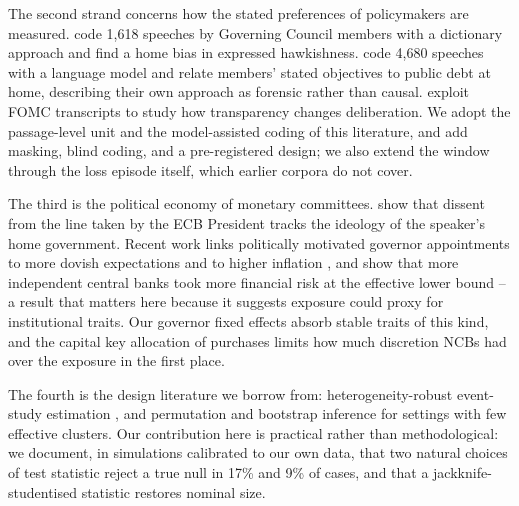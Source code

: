 \documentclass[11pt]{article}
\theoremstyle{plain}
\begin{document}
The second strand concerns how the stated preferences of policymakers are measured. \citet{bennani2017} code 1{,}618 speeches by Governing Council members with a dictionary approach and find a home bias in expressed hawkishness. \citet{heinemann2026} code 4{,}680 speeches with a language model and relate members' stated objectives to public debt at home, describing their own approach as forensic rather than causal. \citet{hansen2018} exploit FOMC transcripts to study how transparency changes deliberation. We adopt the passage-level unit and the model-assisted coding of this literature, and add masking, blind coding, and a pre-registered design; we also extend the window through the loss episode itself, which earlier corpora do not cover.

The third is the political economy of monetary committees. \citet{moschella2020} show that dissent from the line taken by the ECB President tracks the ideology of the speaker's home government. Recent work links politically motivated governor appointments to more dovish expectations and to higher inflation \citep{imf2026governors}, and \citet{bartels2026} show that more independent central banks took more financial risk at the effective lower bound -- a result that matters here because it suggests exposure could proxy for institutional traits. Our governor fixed effects absorb stable traits of this kind, and the capital key allocation of purchases limits how much discretion NCBs had over the exposure in the first place.

The fourth is the design literature we borrow from: heterogeneity-robust event-study estimation \citep{borusyak2024,callaway2021}, and permutation and bootstrap inference for settings with few effective clusters. Our contribution here is practical rather than methodological: we document, in simulations calibrated to our own data, that two natural choices of test statistic reject a true null in 17\% and 9\% of cases, and that a jackknife-studentised statistic restores nominal size.
\end{document}
